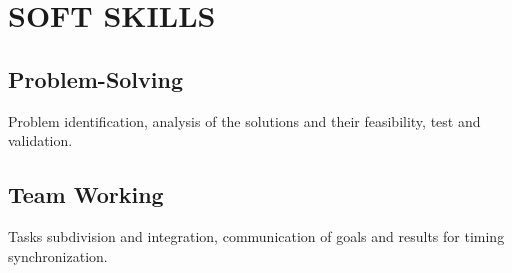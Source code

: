 \section{SOFT SKILLS}
    \subsection{Problem-Solving}
        Problem identification, analysis of the solutions and their feasibility, test and validation.
    \subsection{Team Working}
        Tasks subdivision and integration, communication of goals and results for timing synchronization.